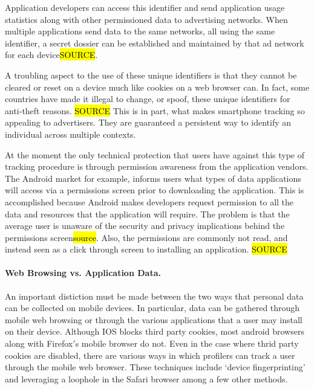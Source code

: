 Application developers can access this identifier and send application usage statistics along with other permissioned data to advertising networks. When multiple applications send data to the same networks, all using the same identifier, a secret dossier can be established and maintained by that ad network for each device\hl{SOURCE}.

A troubling aspect to the use of these unique identifiers is that they cannot be cleared or reset on a device much like cookies on a web browser can. In fact, some countries have made it illegal to change, or spoof, these unique identifiers for anti-theft reasons. \hl{SOURCE} This is in part, what makes smartphone tracking so appealing to advertisers. They are guaranteed a persistent way to identify an individual across multiple contexts.

At the moment the only technical protection that users have against this type of tracking procedure is through permission awareness from the application vendors. The Android market for example, informs users what types of data applications will access via a permissions screen prior to downloading the application. This is accomplished because Android makes developers request permission to all the data and resources that the application will require. The problem is that the average user is unaware of the security and privacy implications behind the permissions screen\hl{source}. Also, the permissions are commonly not read, and instead seen as a click through screen to installing an application. \hl{SOURCE}  

		\paragraph{Web Browsing vs. Application Data.}
An important distiction must be made between the two ways that personal data can be collected on mobile devices. In particular, data can be gathered through mobile web browsing or through the various applications that a user may install on their device. Although IOS blocks third party cookies, most android browsers along with Firefox$'$s mobile browser do not\cite{Trust2013b}.  Even in the case where thrid party cookies are disabled, there are various ways in which profilers can track a user through the mobile web browser. These techniques include `device fingerprinting'\cite{Eff2010} and leveraging a loophole in the Safari browser \cite{John2012} among a few other methods\cite{Trust2013b}. 


